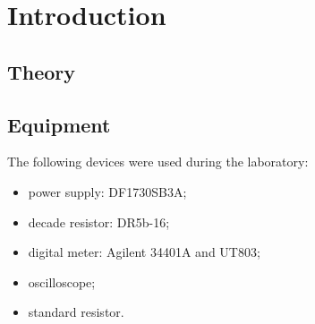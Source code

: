 \section{Introduction}

\subsection{Theory}

\subsection{Equipment}

The following devices were used during the laboratory:

\begin{itemize}
	\item power supply: DF1730SB3A;
	\item decade resistor: DR5b-16;
	\item digital meter:  Agilent 34401A and UT803;
	\item oscilloscope;
	\item standard resistor.
\end{itemize}